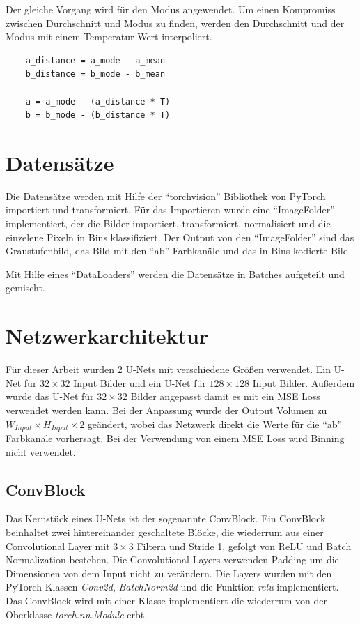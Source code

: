 Der gleiche Vorgang wird für den Modus angewendet. Um einen Kompromiss zwischen Durchschnitt und Modus zu finden, werden den Durchschnitt 
und der Modus mit einem Temperatur Wert interpoliert.

\begin{listing}[H]
  \begin{verbatim}
    a_distance = a_mode - a_mean
    b_distance = b_mode - b_mean

    a = a_mode - (a_distance * T)
    b = b_mode - (b_distance * T)
  \end{verbatim}
\end{listing}

\section{Datensätze}
Die Datensätze werden mit Hilfe der ``torchvision'' Bibliothek von PyTorch importiert und transformiert. Für das Importieren wurde eine
``ImageFolder'' implementiert, der die Bilder importiert, transformiert, normalisiert und die einzelene Pixeln in Bins klassifiziert. 
Der Output von den ``ImageFolder'' sind das Graustufenbild, das Bild mit den ``ab'' Farbkanäle und das in Bins kodierte Bild.

Mit Hilfe eines ``DataLoaders'' werden die Datensätze in Batches aufgeteilt und gemischt.

\section{Netzwerkarchitektur}
Für dieser Arbeit wurden 2 U-Nets mit verschiedene Größen verwendet. Ein U-Net für $ 32 \times 32 $ Input Bilder und ein U-Net für $ 128 \times 128 $ 
Input Bilder. Außerdem wurde das U-Net für $ 32 \times 32 $ Bilder angepasst damit es mit ein MSE Loss verwendet werden kann. Bei der Anpassung wurde
der Output Volumen zu $ W_{Input} \times H_{Input} \times 2 $ geändert, wobei das Netzwerk direkt die Werte für die ``ab'' Farbkanäle vorhersagt.
Bei der Verwendung von einem MSE Loss wird Binning nicht verwendet.
 
\subsection{ConvBlock}
Das Kernstück eines U-Nets ist der sogenannte ConvBlock. Ein ConvBlock beinhaltet zwei hintereinander geschaltete Blöcke, die wiederrum
aus einer Convolutional Layer mit $3 \times 3$ Filtern und Stride 1, gefolgt von ReLU und Batch Normalization bestehen. 
Die Convolutional Layers verwenden Padding um die Dimensionen von dem Input nicht zu verändern. Die Layers wurden mit den PyTorch 
Klassen \textit{Conv2d}, \textit{BatchNorm2d} und die Funktion \textit{relu} implementiert. Das ConvBlock wird mit einer Klasse implementiert
die wiederrum von der Oberklasse \textit{torch.nn.Module} erbt.

